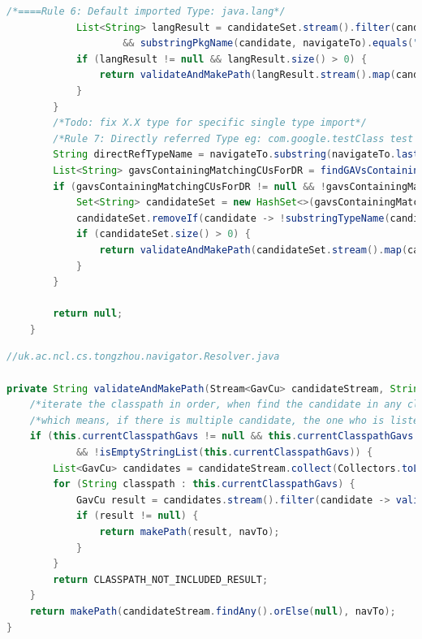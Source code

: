 \documentclass[runningheads]{llncs}
\begin{document}
\begin{lstlisting}[language=Java, caption=Main navigation algorithm]
            /*====Rule 6: Default imported Type: java.lang*/
            List<String> langResult = candidateSet.stream().filter(candidate -> substringPkgName(candidate, navigateTo) != null
                    && substringPkgName(candidate, navigateTo).equals("java.lang")).collect(Collectors.toList());
            if (langResult != null && langResult.size() > 0) {
                return validateAndMakePath(langResult.stream().map(candidate -> new GavCu(candidate)), null);
            }
        }
        /*Todo: fix X.X type for specific single type import*/
        /*Rule 7: Directly referred Type eg: com.google.testClass test = new com.google.testClass()*/
        String directRefTypeName = navigateTo.substring(navigateTo.lastIndexOf(".") + 1, navigateTo.length());
        List<String> gavsContainingMatchingCUsForDR = findGAVsContaining(directRefTypeName);
        if (gavsContainingMatchingCUsForDR != null && !gavsContainingMatchingCUsForDR.isEmpty()) {
            Set<String> candidateSet = new HashSet<>(gavsContainingMatchingCUsForDR);
            candidateSet.removeIf(candidate -> !substringTypeName(candidate).equals(navigateTo));
            if (candidateSet.size() > 0) {
                return validateAndMakePath(candidateSet.stream().map(candidate -> new GavCu(candidate)), null);
            }
        }

        return null;
    }
\end{lstlisting}

\begin{lstlisting}[language=Java, caption=Classpath validation ]
//uk.ac.ncl.cs.tongzhou.navigator.Resolver.java

private String validateAndMakePath(Stream<GavCu> candidateStream, String navTo) {
	/*iterate the classpath in order, when find the candidate in any classpath, make the path with this candidate*/
	/*which means, if there is multiple candidate, the one who is listed upper in classpath will be used.*/
	if (this.currentClasspathGavs != null && this.currentClasspathGavs.size() != 0
			&& !isEmptyStringList(this.currentClasspathGavs)) {
		List<GavCu> candidates = candidateStream.collect(Collectors.toList());
		for (String classpath : this.currentClasspathGavs) {
			GavCu result = candidates.stream().filter(candidate -> validateGavCuInSingleClasspath(candidate, classpath)).findFirst().orElse(null);
			if (result != null) {
				return makePath(result, navTo);
			}
		}
		return CLASSPATH_NOT_INCLUDED_RESULT;
	}
	return makePath(candidateStream.findAny().orElse(null), navTo);
}
\end{lstlisting}
\end{document}

